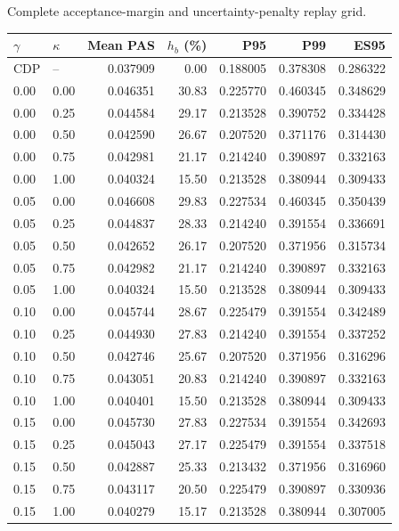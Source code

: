\documentclass[10pt]{article}
\makeatletter
\newenvironment{exporttable}{\par\noindent\begin{minipage}{\linewidth}\def\@captype{table}}{\end{minipage}\par}
\makeatother
\begin{document}
\clearpage
\setcounter{table}{11}
\begin{exporttable}\centering
\small
\caption{Complete acceptance-margin and uncertainty-penalty replay grid.}\label{tab:reliability_grid}
\begin{tabularx}{\linewidth}{YYrrrrr}\toprule
$\gamma$ & $\kappa$ & Mean PAS & $h_b$ (\%) & P95 & P99 & ES95\\\midrule
CDP & -- & 0.037909 & 0.00 & 0.188005 & 0.378308 & 0.286322\\
0.00 & 0.00 & 0.046351 & 30.83 & 0.225770 & 0.460345 & 0.348629\\
0.00 & 0.25 & 0.044584 & 29.17 & 0.213528 & 0.390752 & 0.334428\\
0.00 & 0.50 & 0.042590 & 26.67 & 0.207520 & 0.371176 & 0.314430\\
0.00 & 0.75 & 0.042981 & 21.17 & 0.214240 & 0.390897 & 0.332163\\
0.00 & 1.00 & 0.040324 & 15.50 & 0.213528 & 0.380944 & 0.309433\\
0.05 & 0.00 & 0.046608 & 29.83 & 0.227534 & 0.460345 & 0.350439\\
0.05 & 0.25 & 0.044837 & 28.33 & 0.214240 & 0.391554 & 0.336691\\
0.05 & 0.50 & 0.042652 & 26.17 & 0.207520 & 0.371956 & 0.315734\\
0.05 & 0.75 & 0.042982 & 21.17 & 0.214240 & 0.390897 & 0.332163\\
0.05 & 1.00 & 0.040324 & 15.50 & 0.213528 & 0.380944 & 0.309433\\
0.10 & 0.00 & 0.045744 & 28.67 & 0.225479 & 0.391554 & 0.342489\\
0.10 & 0.25 & 0.044930 & 27.83 & 0.214240 & 0.391554 & 0.337252\\
0.10 & 0.50 & 0.042746 & 25.67 & 0.207520 & 0.371956 & 0.316296\\
0.10 & 0.75 & 0.043051 & 20.83 & 0.214240 & 0.390897 & 0.332163\\
0.10 & 1.00 & 0.040401 & 15.50 & 0.213528 & 0.380944 & 0.309433\\
0.15 & 0.00 & 0.045730 & 27.83 & 0.227534 & 0.391554 & 0.342693\\
0.15 & 0.25 & 0.045043 & 27.17 & 0.225479 & 0.391554 & 0.337518\\
0.15 & 0.50 & 0.042887 & 25.33 & 0.213432 & 0.371956 & 0.316960\\
0.15 & 0.75 & 0.043117 & 20.50 & 0.225479 & 0.390897 & 0.330936\\
0.15 & 1.00 & 0.040279 & 15.17 & 0.213528 & 0.380944 & 0.307005\\

\end{tabularx}
\end{exporttable}
\end{document}
